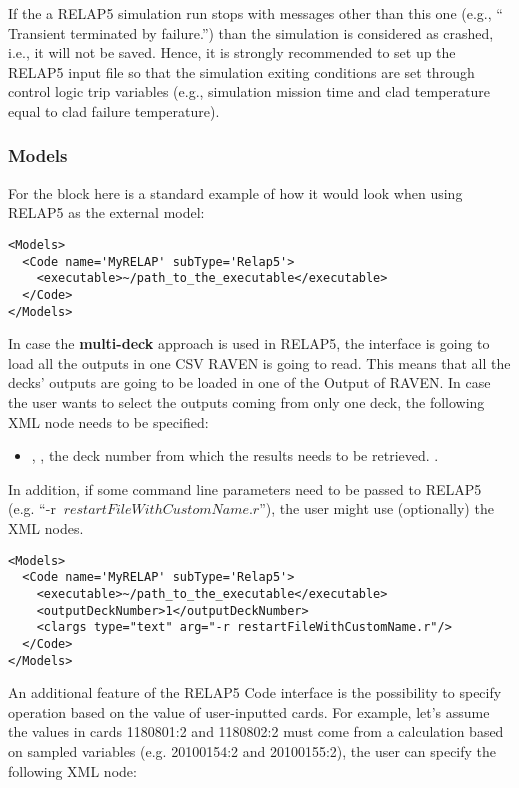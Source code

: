 If the a RELAP5 simulation run stops with messages other than this one (e.g., `` Transient terminated by failure.'') than the simulation is considered as
crashed, i.e., it will not be saved.
Hence, it is strongly recommended to set up the RELAP5 input file so that the simulation exiting conditions are set through control logic trip variables
(e.g., simulation mission time and clad temperature equal to clad failure temperature).

\subsubsection{Models}
\label{subsubsection:Relap5Models}
For the  block here is a standard example of how it would look
when using RELAP5 as the external model:
\begin{lstlisting}[style=XML]
<Models>
  <Code name='MyRELAP' subType='Relap5'>
    <executable>~/path_to_the_executable</executable>
  </Code>
</Models>
\end{lstlisting}
In case the \textbf{multi-deck} approach is used in RELAP5, the interface is going to load all the outputs in one CSV RAVEN is
going to read. This means that all the decks' outputs are going to be loaded in one of the Output of RAVEN. In case the user
wants to select the outputs coming from only one deck, the following XML node needs to be specified:
\begin{itemize}
   \item {}, , the deck number from
   which the results needs to be retrieved. .
\end{itemize}
In addition, if some command line parameters need to be passed to RELAP5 \\(e.g. ``-r
$\: restartFileWithCustomName.r$''), the user might use (optionally) the  XML nodes.
\begin{lstlisting}[style=XML]
<Models>
  <Code name='MyRELAP' subType='Relap5'>
    <executable>~/path_to_the_executable</executable>
    <outputDeckNumber>1</outputDeckNumber>
    <clargs type="text" arg="-r restartFileWithCustomName.r"/>
  </Code>
</Models>
\end{lstlisting}

An additional feature of the RELAP5 Code interface is the possibility to specify operation based on the value of user-inputted
cards. For example, let's assume the values in cards 1180801:2 and 1180802:2 must come from a calculation based on sampled variables (e.g. 20100154:2 and 20100155:2), the user can specify the following XML node:


